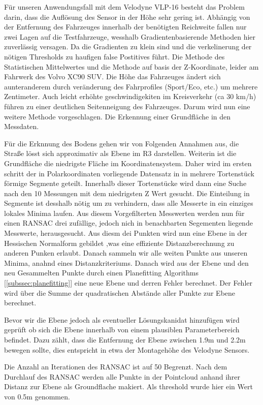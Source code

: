 \documentclass[11pt,oneside,openright]{mpreport}
\begin{document}
Für unseren Anwendungsfall mit dem Velodyne VLP-16 besteht das Problem darin, dass die Auflösung des Sensor in der Höhe sehr gering ist. Abhängig von der Entfernung des 
Fahrzeuges innerhalb der benötigten Reichweite fallen nur zwei Lagen auf die Testfahrzeuge, wesshalb Gradientenbasierende Methoden hier zuverlässig versagen. Da die Gradienten zu klein sind und
die verkelinerung der nötigen Thresholds zu haufigen false Postitives führt. Die Methode des Statistischen Mittelwertes und die Methode auf basis der Z-Koordinate,
leider am Fahrwerk des Volvo XC90 SUV. Die Höhe das Fahrzeuges ändert sich aunteranderem durch veränderung des Fahrprofiles (Sport/Eco, etc.) um mehrere Zentimeter.
Auch leicht erhöhte geschwindigekiten im Kreisverkehr (ca 30 km/h) führen zu einer deutlichen Seitenneigung des Fahrzeuges. Darum wird nun eine weitere Methode vorgeschlagen.
Die Erkennung einer Grundfläche in den Messdaten. 

Für die Erknnung des Bodens gehen wir von Folgenden Annahmen aus, die Straße lösst sich approximativ als Ebene im R3 darstellen. Weiterin ist die Grundfläche die niedrigste
Fläche im Koordinatensystem. Daher wird im ersten schritt der in Polarkoordinaten vorliegende Datensatz in  in mehrere Tortenstück förmige Segmente geteilt.
Innerhalb dieser Tortenstücke wird dann eine Suche nach den 10 Messungen mit dem niedrigsten Z Wert gesucht. Die Einteilung in Segmente ist desshalb nötig
um zu verhindern, dass alle Messerte in ein einziges lokales Minima laufen. Aus diesem Vorgefilterten Messwerten werden nun für einen RANSAC drei zufällige,
jedoch nich in benachbarten Segementen liegende Messwerte, herausgesucht. Aus diesm dei Punkten wird nun eine Ebene in der Hessischen Normalform gebildet
,was eine effiziente Distanzberechnung zu anderen Punken erlaubt. Danach sammeln wir alle weiten Punkte aus unseren Minima, anahnd eines Distanzkriteriums.
Danach wird aus der Ebene und den neu Gesammelten Punkte durch einen Planefitting Algorithms [\cref{subssec:planefitting}] eine neue Ebene und derren Fehler berechnet.
Der Fehler wird über die Summe der quadratischen Abstände aller Punkte zur Ebene berechnet.

Bevor wir die Ebene jedoch als eventueller Lösungskanidat hinzufügen wird geprüft ob sich die Ebene innerhalb von einem plausiblen Parameterbereich befindet.
Dazu zählt, dass die Entfernung der Ebene zwischen 1.9m und 2.2m bewegen sollte, dies entspricht in etwa der Montagehöhe des Velodyne Sensors.

Die Anzahl an Iterationen des RANSAC ist auf 50 Begrenzt. Nach dem Durchlauf des RANSAC werden alle Punkte in der Pointcloud anhand ihrer Distanz zur Ebene als
Groundflache makiert. Als threshold wurde hier ein Wert von 0.5m genommen.
\end{document}
